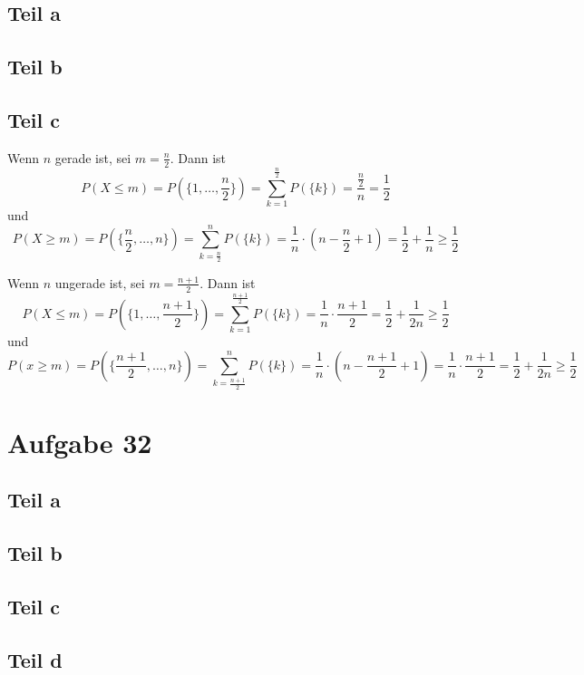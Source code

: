 \documentclass[10pt,a4paper]{article}
\begin{document}
\subsection{Teil a}

\subsection{Teil b}

\subsection{Teil c}
Wenn $n$ gerade ist, sei $m = \frac{n}{2}$.
Dann ist
\begin{equation}
  P(X \le m) = P(\{ 1, \dots, \frac{n}{2} \}) = \sum_{k = 1}^{\frac{n}{2}} P(\{k\}) = \frac{\frac{n}{2}}{n} = \frac{1}{2}
\end{equation}
und
\begin{equation}
  P(X \ge m) = P(\{ \frac{n}{2}, \dots, n \}) = \sum_{k = \frac{n}{2}}^{n} P(\{k\}) = \frac{1}{n} \cdot (n - \frac{n}{2} + 1) = \frac{1}{2} + \frac{1}{n} \ge \frac{1}{2}
\end{equation}

Wenn $n$ ungerade ist, sei $m = \frac{n + 1}{2}$.
Dann ist
\begin{equation}
  P(X \le m) = P(\{ 1, \dots, \frac{n + 1}{2} \}) = \sum_{k = 1}^{\frac{n + 1}{2}} P(\{k\}) = \frac{1}{n} \cdot \frac{n + 1}{2} = \frac{1}{2} + \frac{1}{2n} \ge \frac{1}{2}
\end{equation}
und
\begin{equation}
  P(x \ge m) = P(\{ \frac{n + 1}{2}, \dots, n \}) = \sum_{k = \frac{n + 1}{2}}^{n} P(\{k\}) = \frac{1}{n} \cdot \left( n - \frac{n + 1}{2} + 1 \right) = \frac{1}{n} \cdot \frac{n + 1}{2} = \frac{1}{2} + \frac{1}{2n} \ge \frac{1}{2}
\end{equation}

\section{Aufgabe 32}

\subsection{Teil a}

\subsection{Teil b}

\subsection{Teil c}

\subsection{Teil d}
\end{document}
